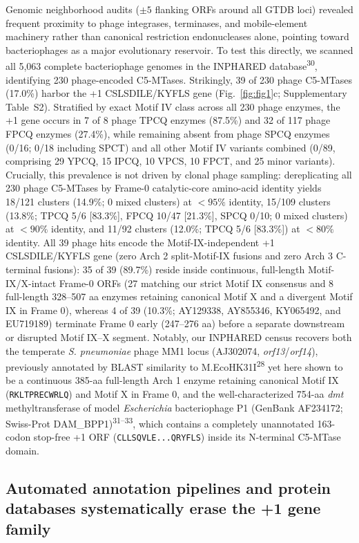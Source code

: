 \documentclass[10pt,letterpaper]{article}
\newcommand{\spname}[1]{\textit{#1}}
\newcommand{\gene}[1]{\textit{#1}}
\newcommand{\refsup}[1]{\textsuperscript{#1}}
\begin{document}
Genomic neighborhood audits ($\pm 5$ flanking ORFs around all GTDB loci) revealed frequent proximity to phage integrases, terminases, and mobile-element machinery rather than canonical restriction endonucleases alone, pointing toward bacteriophages as a major evolutionary reservoir. To test this directly, we scanned all 5,063 complete bacteriophage genomes in the INPHARED database\refsup{30}, identifying 230 phage-encoded C5-MTases. Strikingly, 39 of 230 phage C5-MTases (17.0\%) harbor the +1 CSLSDILE/KYFLS gene (Fig.~\ref{fig:fig1}c; Supplementary Table~S2). Stratified by exact Motif IV class across all 230 phage enzymes, the +1 gene occurs in 7 of 8 phage TPCQ enzymes (87.5\%) and 32 of 117 phage FPCQ enzymes (27.4\%), while remaining absent from phage SPCQ enzymes (0/16; 0/18 including SPCT) and all other Motif IV variants combined (0/89, comprising 29 YPCQ, 15 IPCQ, 10 VPCS, 10 FPCT, and 25 minor variants). Crucially, this prevalence is not driven by clonal phage sampling: dereplicating all 230 phage C5-MTases by Frame-0 catalytic-core amino-acid identity yields 18/121 clusters (14.9\%; 0 mixed clusters) at $< 95\%$ identity, 15/109 clusters (13.8\%; TPCQ 5/6 [83.3\%], FPCQ 10/47 [21.3\%], SPCQ 0/10; 0 mixed clusters) at $< 90\%$ identity, and 11/92 clusters (12.0\%; TPCQ 5/6 [83.3\%]) at $< 80\%$ identity. All 39 phage hits encode the Motif-IX-independent +1 CSLSDILE/KYFLS gene (zero Arch 2 split-Motif-IX fusions and zero Arch 3 C-terminal fusions): 35 of 39 (89.7\%) reside inside continuous, full-length Motif-IX/X-intact Frame-0 ORFs (27 matching our strict Motif IX consensus and 8 full-length 328--507 aa enzymes retaining canonical Motif X and a divergent Motif IX in Frame 0), whereas 4 of 39 (10.3\%; AY129338, AY855346, KY065492, and EU719189) terminate Frame 0 early (247--276 aa) before a separate downstream or disrupted Motif IX--X segment. Notably, our INPHARED census recovers both the temperate \spname{S. pneumoniae} phage MM1 locus (AJ302074, \gene{orf13}/\gene{orf14}), previously annotated by BLAST similarity to M.EcoHK31I\refsup{28} yet here shown to be a continuous 385-aa full-length Arch 1 enzyme retaining canonical Motif IX (\texttt{RKLTPRECWRLQ}) and Motif X in Frame 0, and the well-characterized 754-aa \gene{dmt} methyltransferase of model \spname{Escherichia} bacteriophage P1 (GenBank AF234172; Swiss-Prot DAM\_BPP1)\refsup{31--33}, which contains a completely unannotated 163-codon stop-free +1 ORF (\texttt{CLLSQVLE...QRYFLS}) inside its N-terminal C5-MTase domain.

\subsection{Automated annotation pipelines and protein databases systematically erase the +1 gene family}
\end{document}
